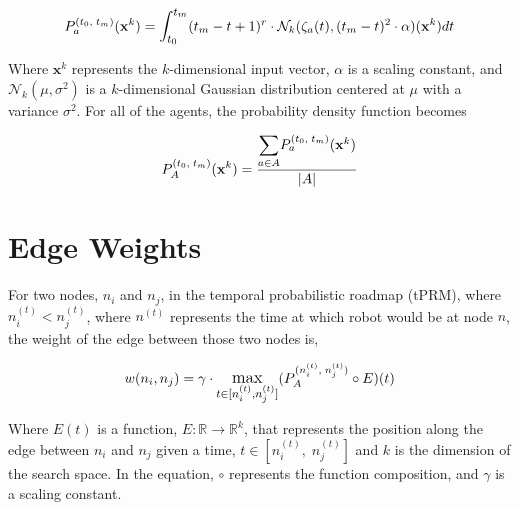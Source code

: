 \documentclass{article}
\newcommand{\Normal}[2]{\mathcal{N}_k(#1, #2)}
\newcommand{\n}[2]{\ensuremath{n^{(#2)}_{#1}}}
\newcommand{\PA}{\ensuremath{P^{(\n{i}{t},\;\n{j}{t})}_{A}}}
\newcommand{\PD}{\ensuremath{P^{(t_0,\;t_m)}_{a}}}
\newcommand{\PAll}{\ensuremath{P^{(t_0,\;t_m)}_{A}}}
\begin{document}
$$\PD(\mathbf{x}^k) = \mathlarger{\int_{t_0}^{t_m}}(t_m - t + 1)^r
\cdot \Normal{\zeta_a(t)}{(t_m - t)^2 \cdot \alpha}(\mathbf{x}^k)dt$$

Where $\mathbf{x}^k$ represents the $k$-dimensional input vector, $\alpha$ is a
scaling constant, and $\mathcal{N}_k(\mu, \sigma^2)$ is a $k$-dimensional
Gaussian distribution centered at $\mu$ with a variance $\sigma^2$. For all of
the agents, the probability density function becomes

$$\PAll(\mathbf{x}^k) = \frac{\mathlarger{\sum_{a \in A}}
\PD(\mathbf{x}^k)}{|A|}$$

\section{Edge Weights}

For two nodes, $n_i$ and $n_j$, in the temporal probabilistic roadmap (tPRM),
where $\n{i}{t} < \n{j}{t}$, where $n^{(t)}$ represents the time at which robot
would be at node $n$, the weight of the edge between those two nodes is,

$$w(n_i, n_j) = \gamma \cdot \mathlarger{\max_{t \in [\n{i}{t},
    \n{j}{t}]}}(\PA \circ E)(t)$$

Where $E(t)$ is a function, $E: \mathbb{R} \to \mathbb{R}^k$, that represents
the position along the edge between $n_i$ and $n_j$ given a time, $t
\in [\n{i}{t},\;\n{j}{t}]$ and $k$ is the dimension of the search space. In the
equation, $\circ$ represents the function composition, and $\gamma$ is a
scaling constant.
\end{document}
